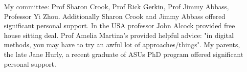 
My committee: Prof Sharon Crook, Prof  Rick Gerkin, Prof Jimmy Abbass, Professor Yi Zhou. Additionally Sharon Crook and Jimmy Abbass offered significant personal support. 
In the USA professor John Alcock provided free house sitting deal. Prof Amelia Martina's provided helpful advice: "in digital methods, you may have to try an awful lot of approaches/things".
My parents, the late Jane Hurly, a recent graduate of ASUs PhD program offered significant personal support. 